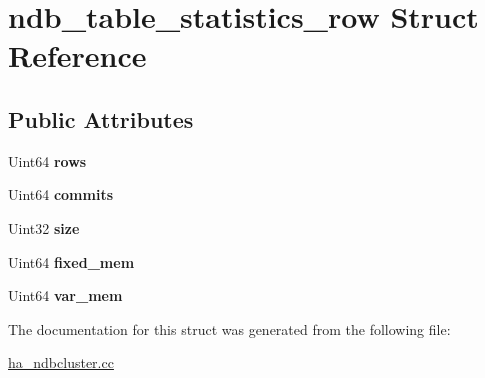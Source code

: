 \hypertarget{structndb__table__statistics__row}{}\section{ndb\+\_\+table\+\_\+statistics\+\_\+row Struct Reference}
\label{structndb__table__statistics__row}
\subsection*{Public Attributes}
\begin{DoxyCompactItemize}
\item 
\mbox{\label{structndb__table__statistics__row_a5d7b2da98e2ec30bf60ed50c954ce520}} 
Uint64 {\bfseries rows}
\item 
\mbox{\label{structndb__table__statistics__row_a2946e4fa8cd548b9dd72339fd5c64449}} 
Uint64 {\bfseries commits}
\item 
\mbox{\label{structndb__table__statistics__row_ad292062fbef16ff703dc19701ed71efd}} 
Uint32 {\bfseries size}
\item 
\mbox{\label{structndb__table__statistics__row_a3ddb259e934e0741b473bdffd820bed5}} 
Uint64 {\bfseries fixed\+\_\+mem}
\item 
\mbox{\label{structndb__table__statistics__row_aaf1042e34f22c7cf8fae89731bfbfd91}} 
Uint64 {\bfseries var\+\_\+mem}
\end{DoxyCompactItemize}


The documentation for this struct was generated from the following file\+:\begin{DoxyCompactItemize}
\item 
\mbox{\hyperlink{ha__ndbcluster_8cc}{ha\+\_\+ndbcluster.\+cc}}\end{DoxyCompactItemize}
